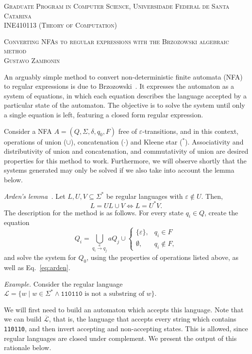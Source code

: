 \documentclass[12pt]{article}
\newcommand{\e}{\varepsilon}
\begin{document}
\textsc{Graduate Program in Computer Science,
Universidade Federal de Santa Catarina} \\
\textsc{INE410113 (Theory of Computation)}

\textsc{Converting NFAs to regular expressions
with the Brzozowski algebraic method} \\
\textsc{Gustavo Zambonin}

An arguably simple method to convert non-deterministic finite automata (NFA) to
regular expressions is due to Brzozowski~\cite{Brzozowski:article:1964:oct}. It
expresses the automaton as a system of equations, in which each equation
describes the language accepted by a particular state of the automaton. The
objective is to solve the system until only a single equation is left,
featuring a closed form regular expression.

Consider a NFA $A = (Q, \Sigma, \delta, q_0, F)$ free of $\e$-transitions, and
in this context, operations of union ($\cup$), concatenation ($\cdot$) and
Kleene star ($^*$). Associativity and distributivity of union and
concatenation, and commutativity of union are desired properties for this
method to work. Furthermore, we will observe shortly that the systems generated
may only be solved if we also take into account the lemma below.

\emph{Arden's lemma~\cite{Arden:inproc:1961:oct}.} Let $L, U, V \subseteq
\Sigma^*$ be regular languages with $\e \not\in U$. Then,
\begin{equation}\label{eq:arden}
  L = UL \cup V \Leftrightarrow L = U^*V.
\end{equation}
The description for the method is as follows. For every state $q_i\in Q$,
create the equation
\begin{equation}\label{eq:brzo}
  Q_i = \bigcup\limits_{q_i \overset{a}{\to} q_j} aQ_j \cup
  \begin{cases}
      \{\e\},       & q_i \in F \\
      \emptyset,    & q_i \not\in F,
  \end{cases}
\end{equation}
and solve the system for $Q_0$, using the properties of operations listed
above, as well as Eq.~\ref{eq:arden}.

\emph{Example.} Consider the regular language $\mathcal{L} = \{w \mid w \in
\Sigma^* \land \texttt{110110} \text{ is not a substring of } w\}$.

We will first need to build an automaton which accepts this language. Note that
we can build $\overline{\mathcal{L}}$, that is, the language that accepts every
string which contains \texttt{110110}, and then invert accepting and
non-accepting states. This is allowed, since regular languages are closed under
complement. We present the output of this rationale below.
\end{document}
